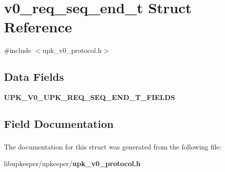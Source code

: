 \section{v0\_\-req\_\-seq\_\-end\_\-t Struct Reference}
\label{structv0__req__seq__end__t}


{\ttfamily \#include $<$upk\_\-v0\_\-protocol.h$>$}

\subsection*{Data Fields}
\begin{DoxyCompactItemize}
\item 
{\bf UPK\_\-V0\_\-UPK\_\-REQ\_\-SEQ\_\-END\_\-T\_\-FIELDS}
\end{DoxyCompactItemize}


\subsection{Field Documentation}
\subsubsection[{UPK\_\-V0\_\-UPK\_\-REQ\_\-SEQ\_\-END\_\-T\_\-FIELDS}]{}\label{structv0__req__seq__end__t_a57372dd40042d409bec87f5dd78d1516}


The documentation for this struct was generated from the following file:\begin{DoxyCompactItemize}
\item 
libupkeeper/upkeeper/{\bf upk\_\-v0\_\-protocol.h}\end{DoxyCompactItemize}
